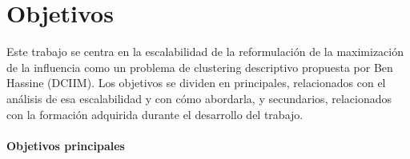 \documentclass[12pt,twoside,titlepage]{report}
\begin{document}

\section{Objetivos} \label{sec:objetivos}


Este trabajo se centra en la escalabilidad de la reformulación de la maximización de la influencia como un problema de clustering descriptivo propuesta por Ben Hassine \cite{motaz} (DCIIM).
Los objetivos se dividen en principales, relacionados con el análisis de esa escalabilidad y con cómo abordarla, y secundarios, relacionados con la formación adquirida durante el desarrollo del trabajo.

\paragraph{Objetivos principales}
\end{document}
